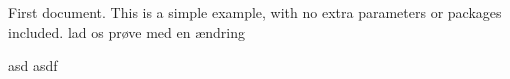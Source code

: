\documentclass{article}
\begin{document}
First document. This is a simple example, with no 
extra parameters or packages included.
lad os prøve med en ændring

asd
asdf
\end{document}
